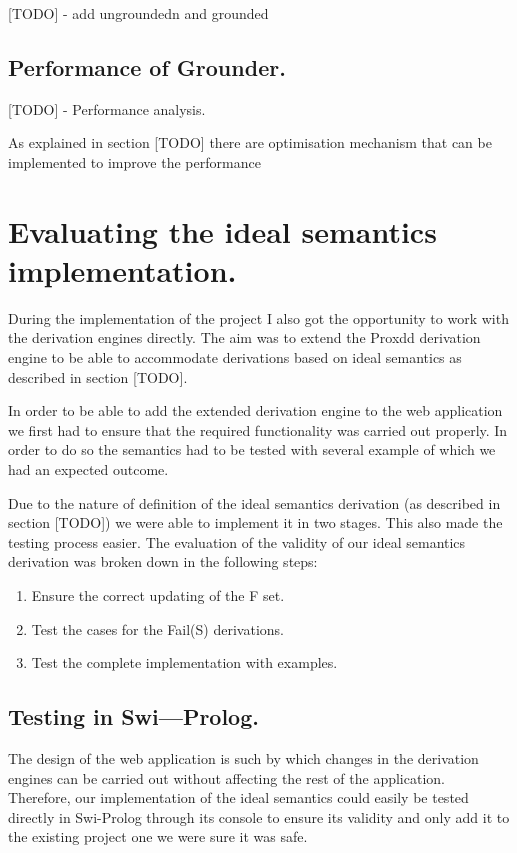 [TODO] - add ungroundedn and grounded


\subsection{Performance of Grounder.}

[TODO] - Performance analysis.

As explained in section [TODO] there are optimisation mechanism that can be implemented to improve the performance

\section{Evaluating the ideal semantics implementation.}
During the implementation of the project I also got the opportunity to work with the derivation engines directly. The aim was to extend the Proxdd derivation engine to be able to accommodate derivations based on ideal semantics as described in section [TODO].

In order to be able to add the extended derivation engine to the web application we first had to ensure that the required functionality was carried out properly. In order to do so the semantics had to be tested with several example of which we had an expected outcome.

Due to the nature of definition of the ideal semantics derivation (as described in section [TODO]) we were able to implement it in two stages. This also made the testing process easier. The evaluation of the validity of our ideal semantics derivation  was broken down in the following steps:

\begin{enumerate}
\item Ensure the correct updating of the F set.
\item Test the cases for the Fail(S) derivations.
\item Test the complete implementation with examples.
\end{enumerate}

\subsection{Testing in Swi---Prolog.}
The design of the web application is such by which changes in the derivation engines can be carried out without affecting the rest of the application. Therefore, our implementation of the ideal semantics could easily be tested directly in Swi-Prolog through its console to ensure its validity and only add it to the existing project one we were sure it was safe.

